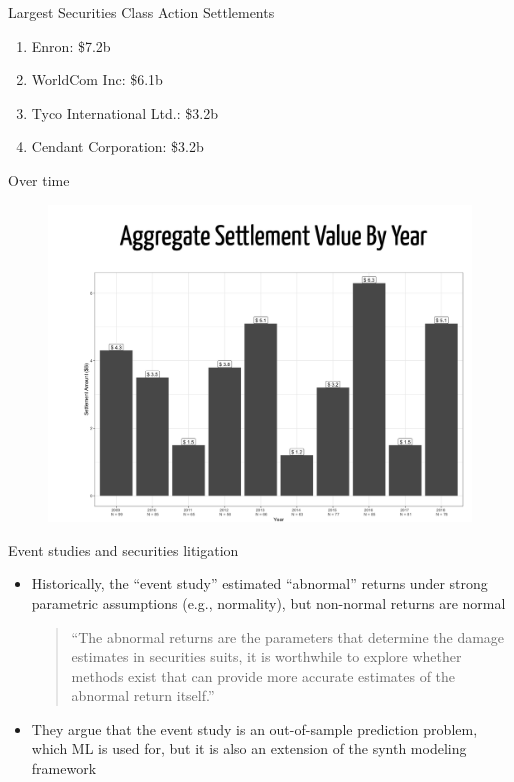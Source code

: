 \documentclass{beamer}
\begin{document}
\begin{frame}{Largest Securities Class Action Settlements}

\begin{enumerate}

\item Enron: \$7.2b
\item WorldCom Inc: \$6.1b
\item Tyco International Ltd.: \$3.2b
\item Cendant Corporation: \$3.2b

\end{enumerate}

\end{frame}

\begin{frame}{Over time}

\begin{figure}
\includegraphics[scale=0.35]{./lecture_includes/baker_gelbach_1}
\end{figure}
\end{frame}

\begin{frame}{Event studies and securities litigation}

\begin{itemize}

\item Historically, the ``event study'' estimated ``abnormal'' returns under strong parametric assumptions (e.g., normality), but non-normal returns are normal

\begin{quote}
``The abnormal returns are the parameters that determine the damage estimates in securities suits, it is worthwhile to explore whether methods exist that can provide more accurate estimates of the abnormal return itself.''
\end{quote}

\item They argue that the event study is an out-of-sample prediction problem, which ML is used for, but it is also an extension of the synth modeling framework

\end{itemize}

\end{frame}
\end{document}

